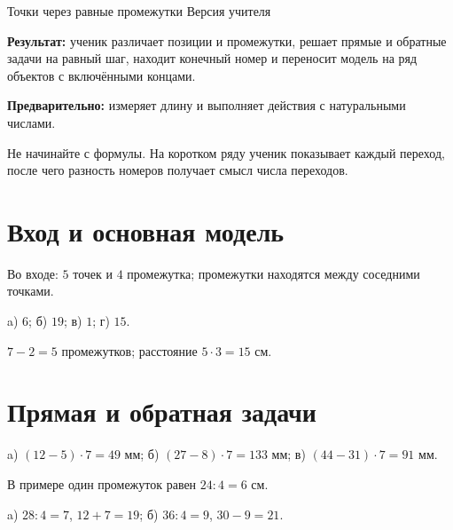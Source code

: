 \worksheettitle
  {Точки через равные промежутки}
  { Версия учителя}

\begin{teacherbox}
  \textbf{Результат:} ученик различает позиции и промежутки, решает прямые и
  обратные задачи на равный шаг, находит конечный номер и переносит модель
  на ряд объектов с включёнными концами.

  \textbf{Предварительно:} измеряет длину и выполняет действия с натуральными
  числами.
\end{teacherbox}

\begin{teacherbox}
  Не начинайте с формулы. На коротком ряду ученик показывает каждый переход,
  после чего разность номеров получает смысл числа переходов.
\end{teacherbox}

\section{Вход и основная модель}

Во входе: $5$ точек и $4$ промежутка; промежутки находятся между соседними
точками.

\pointsvsintervalsfigure

\begin{practicebox}
  a) $6$; б) $19$; в) $1$; г) $15$.
\end{practicebox}

\studentcountstrip

\begin{practicebox}[2. По рисунку]
  $7-2=5$ промежутков; расстояние $5\cdot3=15$ см.
\end{practicebox}

\section{Прямая и обратная задачи}

\distanceexamplefigure

\begin{practicebox}[3. Расстояния]
  a) $(12-5)\cdot7=49$ мм;
  б) $(27-8)\cdot7=133$ мм;
  в) $(44-31)\cdot7=91$ мм.
\end{practicebox}

\reverseexamplefigure

В примере один промежуток равен $24:4=6$ см.

\begin{practicebox}
  a) $28:4=7$, $12+7=19$;
  б) $36:4=9$, $30-9=21$.
\end{practicebox}

